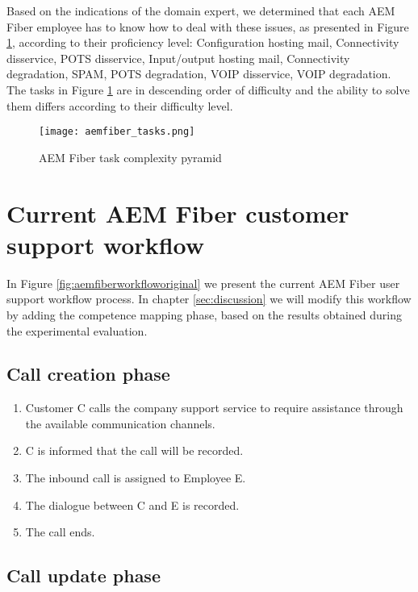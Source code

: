 Based on the indications of the domain expert, we determined that each AEM Fiber employee has to know how to deal with these issues, as presented in Figure \ref{fig:aemfibertasks}, according to their proficiency level: Configuration hosting mail, Connectivity disservice, POTS disservice, Input/output hosting mail, Connectivity degradation, SPAM, POTS degradation, VOIP disservice, VOIP degradation. The tasks in Figure \ref{fig:aemfibertasks} are in descending order of difficulty and the ability to solve them differs according to their difficulty level.

\begin{center}
      \begin{figure}[ht]
            \centering
            \texttt{[image: aemfiber\_tasks.png]}
            \caption[short]{AEM Fiber task complexity pyramid}
            \label{fig:aemfibertasks}
      \end{figure}
\end{center}
\newpage

\section{Current AEM Fiber customer support workflow}

In Figure \ref{fig:aemfiberworkfloworiginal} we present the current AEM Fiber user support workflow process. In chapter \ref{sec:discussion} we will modify this workflow by adding the competence mapping phase, based on the results obtained during the experimental evaluation.

\subsection*{Call creation phase}

\begin{enumerate}
      \item Customer C calls the company support service to require assistance through the available communication channels.
      \item C is informed that the call will be recorded.
      \item The inbound call is assigned to Employee E.
      \item The dialogue between C and E is recorded.
      \item The call ends.
\end{enumerate}

\subsection*{Call update phase}

